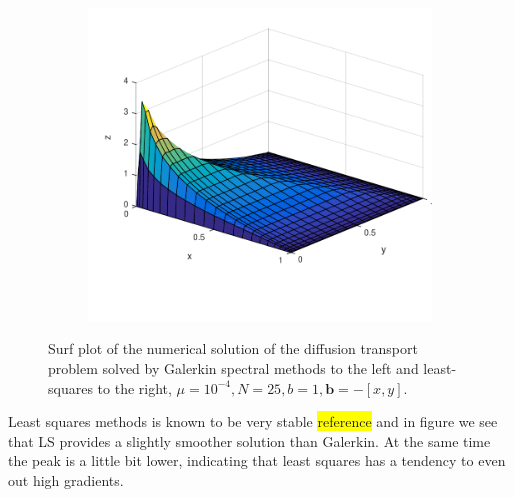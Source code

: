 \begin{figure}[h]
\begin{subfigure}[b]{0.48\textwidth}
	\includegraphics[width=\textwidth]{Figures/SpecLS_difftrans_aNeg.pdf}
  \end{subfigure}
  \vspace{-0.1\baselineskip}
	\caption{Surf plot of the numerical solution of the diffusion transport problem solved by Galerkin spectral methods to the left and least-squares to the right, $\mu = 10^{-4},N=25,b = 1, \mathbf{b} = -[x,y]$.}
  \label{fig:SurfDiffTransNeg}
\end{figure}
%
Least squares methods is known to be very stable \colorbox{yellow}{reference} and in figure we see that LS provides a slightly smoother solution than Galerkin. At the same time the peak is a little bit lower, indicating that least squares has a tendency to even out high gradients.  
%
